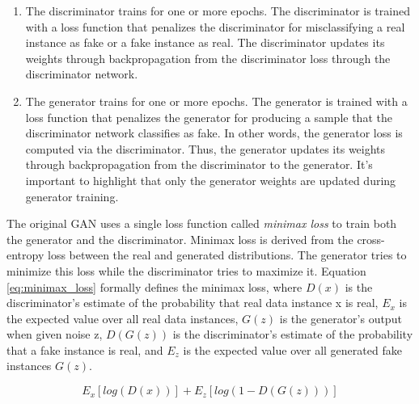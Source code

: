 \begin{enumerate}
    \item The discriminator trains for one or more epochs.
    The discriminator is trained with a loss function that penalizes the discriminator for misclassifying a real instance as fake or a fake instance as real. The discriminator updates its weights through backpropagation from the discriminator loss through the discriminator network.

    \item The generator trains for one or more epochs.
    The generator is trained with a loss function that penalizes the generator for producing a sample that the discriminator network classifies as fake. In other words, the generator loss is computed via the discriminator. Thus, the generator updates its weights through backpropagation from the discriminator to the generator. It's important to highlight that only the generator weights are updated during generator training.
\end{enumerate}

The original GAN uses a single loss function called \textit{minimax loss} to train both the generator and the discriminator. Minimax loss is derived from the cross-entropy loss between the real and generated distributions. The generator tries to minimize this loss while the discriminator tries to maximize it. Equation \ref{eq:minimax_loss} formally defines the minimax loss, where $D(x)$ is the discriminator's estimate of the probability that real data instance x is real, $E_x$ is the expected value over all real data instances, $G(z)$ is the generator's output when given noise z, $D(G(z))$ is the discriminator's estimate of the probability that a fake instance is real, and $E_z$ is the expected value over all generated fake instances $G(z)$.

\begin{equation} \label{eq:minimax_loss}
    E_x[log(D(x))] + E_z[log(1 - D(G(z)))]
\end{equation}

